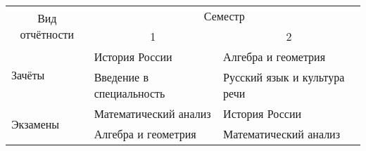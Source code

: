 \documentclass{article}
\begin{document}
\begin{table}[!ht]
\begin{tabular}{|l|llll|}
\hline
\multicolumn{1}{|c|}{\multirow{2}{*}{Вид отчётности}} & \multicolumn{4}{c|}{Семестр}                                                                      \\ \cline{2-5} 
\multicolumn{1}{|c|}{}                                & \multicolumn{2}{c|}{1}                        & \multicolumn{2}{c|}{2}                            \\ \hline
\multirow{2}{*}{Зачёты}                               & \multicolumn{2}{l|}{История России}           & \multicolumn{2}{l|}{Алгебра и геометрия}          \\ \cline{2-5} 
                                                      & \multicolumn{2}{l|}{Введение в специальность} & \multicolumn{2}{l|}{Русский язык и культура речи} \\ \hline
\multirow{2}{*}{Экзамены}                             & \multicolumn{2}{l|}{Математический анализ}    & \multicolumn{2}{l|}{История России}               \\ \cline{2-5} 
                                                      & \multicolumn{2}{l|}{Алгебра и геометрия}      & \multicolumn{2}{l|}{Математический анализ}        \\ \hline
\end{tabular}
\end{table}
\end{document}
